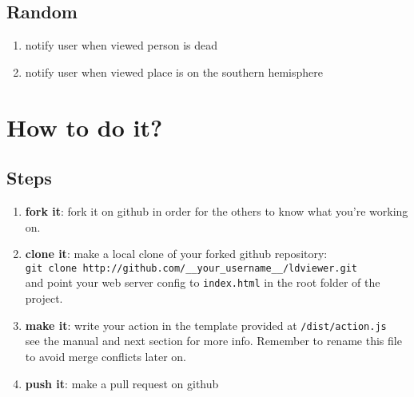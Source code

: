 \documentclass{article}
\begin{document}
\subsection{Random}
\begin{enumerate}
\item notify user when viewed person is dead
\item notify user when viewed place is on the southern hemisphere
\end{enumerate}


\section{How to do it?}
\subsection{Steps}
\begin{enumerate}
\item \textbf{fork it}: fork it on github in order for the others to know what you're working on.
\item \textbf{clone it}: make a local clone of your forked github repository:\\
\texttt{git clone http://github.com/\_\_your\_username\_\_/ldviewer.git}\\
and point your web server config to \texttt{index.html} in the root folder of the project.
\item \textbf{make it}: write your action in the template provided at \texttt{/dist/action.js}\\ see the manual and next section for more info. Remember to rename this file to avoid merge conflicts later on.
\item \textbf{push it}: make a pull request on github
\end{enumerate}
\end{document}
